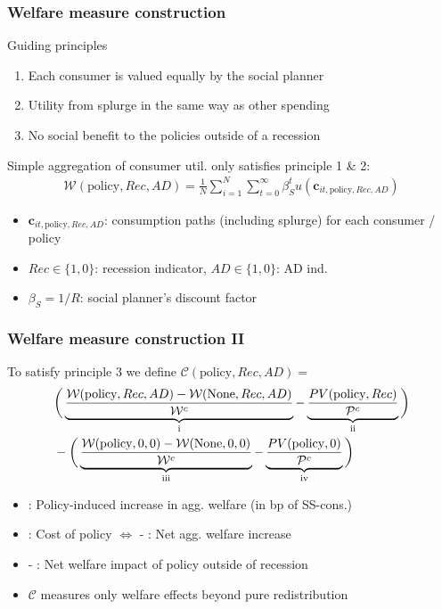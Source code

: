 \documentclass[pdflatex,aspectratio=169]{beamer}
\newcommand{\RNum}[1]{\uppercase\expandafter{\romannumeral #1\relax}}
\begin{document}
\begin{frame}
\frametitle{Welfare measure construction}

	Guiding principles
	
	\begin{enumerate}
		\item Each consumer is valued equally by the social planner 
		\item Utility from splurge in the same way as other spending
		\item No social benefit to the policies outside of a recession
	\end{enumerate} 
	
	\vspace{0.6cm}
	
	Simple aggregation of consumer util. only satisfies principle 1 \& 2:
	\begin{align*}
	\mathcal{W}(\text{policy},Rec,AD) =\frac{1}{N}\sum_{i=1}^{N} \sum_{t=0}^{\infty} \beta_S^t u(\mathbf{c}_{it,\text{policy},Rec,AD}) 
	\end{align*}
	
	\begin{itemize}
		\item $\mathbf{c}_{it,\text{policy},Rec,AD}$: consumption paths (including splurge) for each consumer / policy
		\item $Rec\in\{1,0\}$: recession indicator, $AD\in\{1,0\}$: AD ind.
		\item $\beta_S = 1/R$: social planner's discount factor 
	\end{itemize}	

\end{frame}


\begin{frame}
\frametitle{Welfare measure construction II}

	To satisfy principle 3 we define $\mathcal{C}(\text{policy},Rec,AD) =$
	\begin{align*}
	& \bigg( \underbrace{\frac{\mathcal{W}(\text{policy},Rec,AD)-\mathcal{W}(\text{None},Rec,AD)}{\mathcal{W}^c}}_\text{\RNum{1}}  - \underbrace{\frac{PV(\text{policy},Rec)}{\mathcal{P}^c} }_\text{\RNum{2}} \bigg) \nonumber \\  
	& -
	\bigg( \underbrace{\frac{\mathcal{W}(\text{policy},0,0) - \mathcal{W}(\text{None},0,0)}{\mathcal{W}^c}}_\text{\RNum{3}}  - \underbrace{\frac{PV(\text{policy},0)}{\mathcal{P}^c}}_\text{\RNum{4}}  \bigg) 
	\end{align*}
	
	\begin{itemize}
		\item \RNum{1}: Policy-induced increase in agg. welfare (in bp of SS-cons.)
		\item \RNum{2}: Cost of policy $\Leftrightarrow$ \RNum{1} - \RNum{2}: Net agg. welfare increase
		\item \RNum{3} - \RNum{4}: Net welfare impact of policy outside of recession
		\item $\mathcal{C}$ measures only welfare effects beyond pure redistribution
	\end{itemize}

\end{frame}
\end{document}
